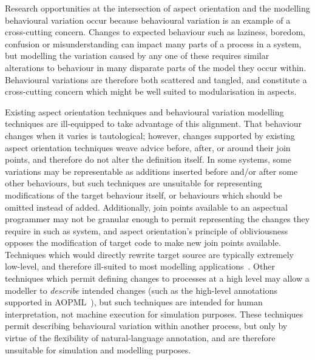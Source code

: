 Research opportunities at the intersection of aspect orientation and the
modelling behavioural variation occur because behavioural variation is an
example of a cross-cutting concern. Changes to expected behaviour such as
laziness, boredom, confusion or misunderstanding can impact many parts of a
process in a \sociotechnical system, but modelling the variation caused by any
one of these requires similar alterations to behaviour in many
disparate parts of the model they occur within. Behavioural variations are
therefore both scattered and tangled, and constitute a cross-cutting concern
which might be well suited to modularisation in aspects.

Existing aspect orientation techniques and behavioural variation modelling
techniques are ill-equipped to take advantage of this alignment. That behaviour
changes when it varies is tautological; however, changes supported by existing
aspect orientation techniques weave advice before, after, or around their join
points, and therefore do not alter the definition itself. In some systems, some
variations may be representable as additions inserted before and/or after some
other behaviours, but such techniques are unsuitable for representing
modifications of the target behaviour itself, or behaviours which should be
omitted instead of added. Additionally, join points available to an aspectual
programmer may not be granular enough to permit representing the changes they
require in such as system, and aspect orientation's principle of obliviousness
opposes the modification of target code to make new join points available.
Techniques which would directly rewrite target source are typically extremely
low-level, and therefore ill-suited to most modelling
applications~\cite{keller1998binary}. Other techniques which permit defining
changes to processes at a high level may allow a modeller to \emph{describe}
intended changes (such as the high-level annotations supported in
AOPML~\cite{Cappelli_AOBPM}), but such techniques are intended for human
interpretation, not machine execution for simulation purposes. These techniques
permit describing behavioural variation within another process, but only by
virtue of the flexibility of natural-language annotation, and are therefore
unsuitable for simulation and modelling purposes.

